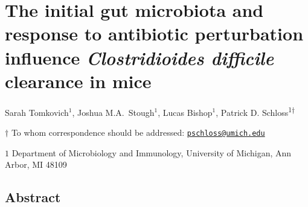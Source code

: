 \documentclass[
  11pt,
]{article}
\author{}
\date{\vspace{-2.5em}}
\begin{document}
\vspace{35mm}

\hypertarget{the-initial-gut-microbiota-and-response-to-antibiotic-perturbation-influence-clostridioides-difficile-clearance-in-mice}{%
\section{\texorpdfstring{The initial gut microbiota and response to
antibiotic perturbation influence \emph{Clostridioides difficile}
clearance in
mice}{The initial gut microbiota and response to antibiotic perturbation influence Clostridioides difficile clearance in mice}}\label{the-initial-gut-microbiota-and-response-to-antibiotic-perturbation-influence-clostridioides-difficile-clearance-in-mice}}

\vspace{35mm}

Sarah Tomkovich\({^1}\), Joshua M.A.~Stough\({^1}\), Lucas
Bishop\({^1}\), Patrick D. Schloss\textsuperscript{1\(\dagger\)}

\vspace{40mm}

\(\dagger\) To whom correspondence should be addressed:
\href{mailto:pschloss@umich.edu}{\nolinkurl{pschloss@umich.edu}}

\(1\) Department of Microbiology and Immunology, University of Michigan,
Ann Arbor, MI 48109

\newpage
\linenumbers

\hypertarget{abstract}{%
\subsection{Abstract}\label{abstract}}
\end{document}
